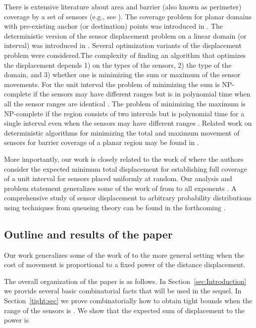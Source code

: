 \documentclass[final,5p,times,twocolumn]{elsarticle_mod}
\begin{document}
There is extensive literature about area and barrier (also known as perimeter) coverage by a set of sensors (e.g., see \cite{abbasi2009movement,barriercoverageNodeDegree,SSL07,kumar2005,saipulla2009,swat2012}). The coverage problem for planar domains with pre-existing anchor (or destination) points was introduced in \cite{tcs2009}. The deterministic version of the sensor displacement problem on a linear domain (or interval) was introduced in \cite{adhocnow2009}. Several optimization variants of the displacement problem were considered.The complexity of finding an algorithm that optimizes the displacement depends 1) on the types of the sensors, 2) the type of the domain, and 3) whether one is minimizing the sum or maximum of the sensor movements. For the unit interval the problem of minimizing the sum is NP-complete if the sensors may have different ranges but is in polynomial time when
all the sensor ranges are identical \cite{adhocnow2010}. The problem of 
minimizing the maximum is NP-complete if the region consists of two intervals \cite{adhocnow2009}
but is polynomial time for a single interval even when the sensors may have different
ranges \cite{swat2012}.
Related work on deterministic
algorithms for minimizing the total and maximum movement
of sensors for barrier coverage of a planar region may
be found in \cite{tcs2009}. 


More importantly, our work is closely related to the work of \cite{spa_2013} where the authors consider the expected minimum total displacement for establishing full coverage of a unit interval
for  sensors placed uniformly at random. Our analysis and problem statement generalizes some of the work of \cite{spa_2013} from  to all exponents . A comprehensive study of sensor displacement to arbitrary probability distributions using techniques from queueing theory can be found in the forthcoming \cite{kranakis2014scheduling}.


\subsection{Outline and results of the paper}

Our work generalizes some of the work
of \cite{spa_2013} to the more general setting
when the cost of movement is proportional to a fixed power
of the distance displacement.

The overall organization of the paper is as follows. 
In Section~\ref{sec:Introduction}
we provide several basic combinatorial facts
that will be used in the sequel. In
Section~\ref{tight:sec} we prove combinatorially how
to obtain tight bounds when the range of the sensors 
is . 
We show that the expected sum of displacement to the power  is 
\end{document}
